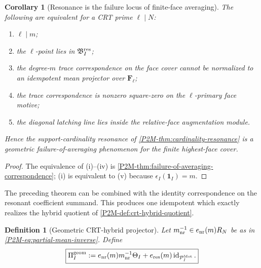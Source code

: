 \documentclass[11pt]{article}
\newtheorem{corollary}[theorem]{Corollary}
\newtheorem{definition}[theorem]{Definition}
\theoremstyle{remark}
\newcommand{\Mot}{\mathrm{Mot}}
\begin{document}
\begin{corollary}[Resonance is the failure locus of finite-face averaging]
\label{P2M-cor:resonance-is-averaging-failure}
The following are equivalent for a CRT prime \(\ell\mid N\):
\begin{enumerate}[label=\textup{(\roman*)}]
\item \(\ell\mid m\);
\item the \(\ell\)-point lies in \(\mathfrak B_I^{\rm res}\);
\item the degree-\(m\) trace correspondence on the face cover cannot be
      normalized to an idempotent mean projector over \(\mathbf F_\ell\);
\item the trace correspondence is nonzero square-zero on the
      \(\ell\)-primary face motive;
\item the diagonal latching line lies inside the relative-face augmentation
      module.
\end{enumerate}
Hence the support-cardinality resonance of
\cref{P2M-thm:cardinality-resonance} is a geometric failure-of-averaging
phenomenon for the finite highest-face cover.
\end{corollary}

\begin{proof}
The equivalence of \textup{(i)}--\textup{(iv)} is
\cref{P2M-thm:failure-of-averaging-correspondence}; \textup{(i)} is equivalent to
\textup{(v)} because \(\epsilon_I(\mathbf1_I)=m\).
\end{proof}

The preceding theorem can be combined with the identity correspondence on the
resonant coefficient summand.  This produces one idempotent which exactly
realizes the hybrid quotient of \cref{P2M-def:crt-hybrid-quotient}.

\begin{definition}[Geometric CRT-hybrid projector]
\label{P2M-def:geometric-crt-hybrid-projector}
Let \(m_{\rm nr}^{-1}\in e_{\rm nr}(m)R_N\) be as in
\eqref{P2M-eq:partial-mean-inverse}.  Define
\begin{equation}\label{P2M-eq:geometric-crt-hybrid-projector}
 \boxed{
 \Pi_I^{\rm geom}
 :=e_{\rm nr}(m)m_{\rm nr}^{-1}\Theta_I
   +e_{\rm res}(m)\operatorname{id}_{\mathcal P_I^{\Mot}}.}
\end{equation}
\end{definition}
\end{document}
